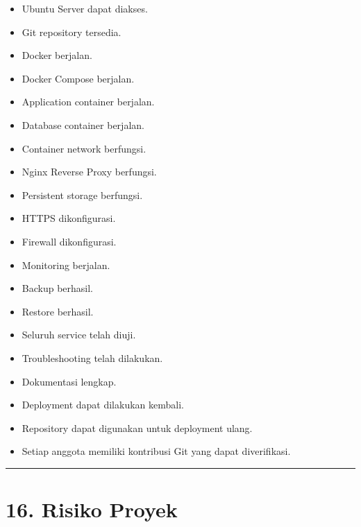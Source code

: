 \documentclass[
]{article}
\providecommand{\tightlist}{%
  \setlength{\itemsep}{0pt}\setlength{\parskip}{0pt}}
\begin{document}
\begin{itemize}
\tightlist
\item[$\square$]
  Ubuntu Server dapat diakses.
\item[$\square$]
  Git repository tersedia.
\item[$\square$]
  Docker berjalan.
\item[$\square$]
  Docker Compose berjalan.
\item[$\square$]
  Application container berjalan.
\item[$\square$]
  Database container berjalan.
\item[$\square$]
  Container network berfungsi.
\item[$\square$]
  Nginx Reverse Proxy berfungsi.
\item[$\square$]
  Persistent storage berfungsi.
\item[$\square$]
  HTTPS dikonfigurasi.
\item[$\square$]
  Firewall dikonfigurasi.
\item[$\square$]
  Monitoring berjalan.
\item[$\square$]
  Backup berhasil.
\item[$\square$]
  Restore berhasil.
\item[$\square$]
  Seluruh service telah diuji.
\item[$\square$]
  Troubleshooting telah dilakukan.
\item[$\square$]
  Dokumentasi lengkap.
\item[$\square$]
  Deployment dapat dilakukan kembali.
\item[$\square$]
  Repository dapat digunakan untuk deployment ulang.
\item[$\square$]
  Setiap anggota memiliki kontribusi Git yang dapat diverifikasi.
\end{itemize}

\begin{center}\rule{0.5\linewidth}{0.5pt}\end{center}

\section{16. Risiko Proyek}\label{risiko-proyek}
\end{document}
